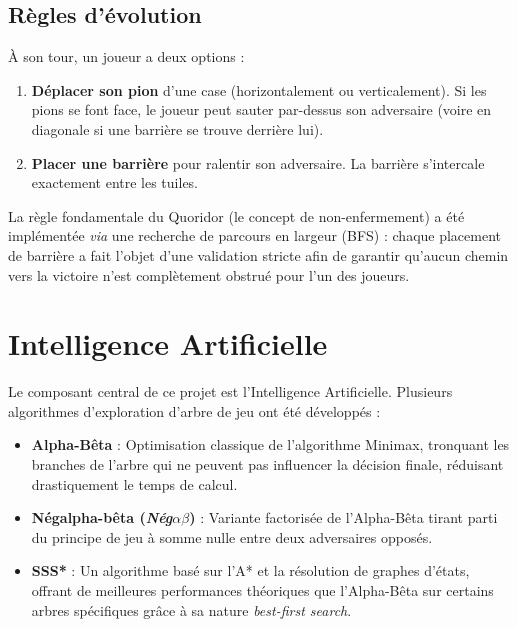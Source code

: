 \documentclass[12pt,a4paper]{article}
\begin{document}
\subsection{Règles d'évolution}
À son tour, un joueur a deux options :
\begin{enumerate}
    \item \textbf{Déplacer son pion} d'une case (horizontalement ou verticalement). Si les pions se font face, le joueur peut sauter par-dessus son adversaire (voire en diagonale si une barrière se trouve derrière lui).
    \item \textbf{Placer une barrière} pour ralentir son adversaire. La barrière s'intercale exactement entre les tuiles.
\end{enumerate}
La règle fondamentale du Quoridor (le concept de non-enfermement) a été implémentée \textit{via} une recherche de parcours en largeur (BFS) : chaque placement de barrière a fait l'objet d'une validation stricte afin de garantir qu'aucun chemin vers la victoire n'est complètement obstrué pour l'un des joueurs.

\section{Intelligence Artificielle}
Le composant central de ce projet est l'Intelligence Artificielle. Plusieurs algorithmes d'exploration d'arbre de jeu ont été développés :
\begin{itemize}
    \item \textbf{Alpha-Bêta} : Optimisation classique de l'algorithme Minimax, tronquant les branches de l'arbre qui ne peuvent pas influencer la décision finale, réduisant drastiquement le temps de calcul.
    \item \textbf{Négalpha-bêta (\textit{Nég$\alpha\beta$})} : Variante factorisée de l'Alpha-Bêta tirant parti du principe de jeu à somme nulle entre deux adversaires opposés.
    \item \textbf{SSS*} : Un algorithme basé sur l'A* et la résolution de graphes d'états, offrant de meilleures performances théoriques que l'Alpha-Bêta sur certains arbres spécifiques grâce à sa nature \textit{best-first search}.
\end{itemize}
\end{document}
